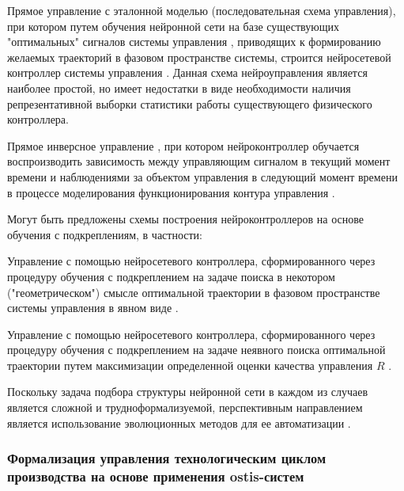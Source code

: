 \begin{textitemize}
    \item Прямое управление с эталонной моделью (последовательная схема управления), при котором путем обучения нейронной сети на базе существующих "оптимальных"{} сигналов системы управления , приводящих к формированию желаемых траекторий в фазовом пространстве системы, строится нейросетевой контроллер системы управления . Данная схема  нейроуправления является наиболее простой, но имеет недостатки в виде необходимости наличия репрезентативной выборки статистики работы существующего физического контроллера.
    
    \item Прямое инверсное управление , при котором нейроконтроллер обучается воспроизводить зависимость между управляющим сигналом в текущий момент времени и наблюдениями за объектом управления в следующий момент времени в процессе моделирования функционирования контура управления  . 
    
    
    \item Могут быть предложены схемы построения нейроконтроллеров на основе обучения с подкреплениям, в частности:
    \begin{textitemize}
        \item  Управление с помощью нейросетевого контроллера, сформированного через процедуру обучения с подкреплением на задаче поиска в некотором ("геометрическом") смысле оптимальной траектории в фазовом пространстве системы управления в явном виде   .

        \item  Управление с помощью нейросетевого контроллера, сформированного через процедуру обучения с подкреплением на задаче неявного поиска оптимальной траектории путем максимизации определенной оценки качества управления $R$  .    
    
    \end{textitemize}

\end{textitemize}

Поскольку задача подбора структуры нейронной сети в каждом из случаев является сложной и трудноформализуемой, перспективным направлением является использование эволюционных методов для ее автоматизации . 

\subsubsection{Формализация управления технологическим циклом производства на основе применения ostis-систем}

